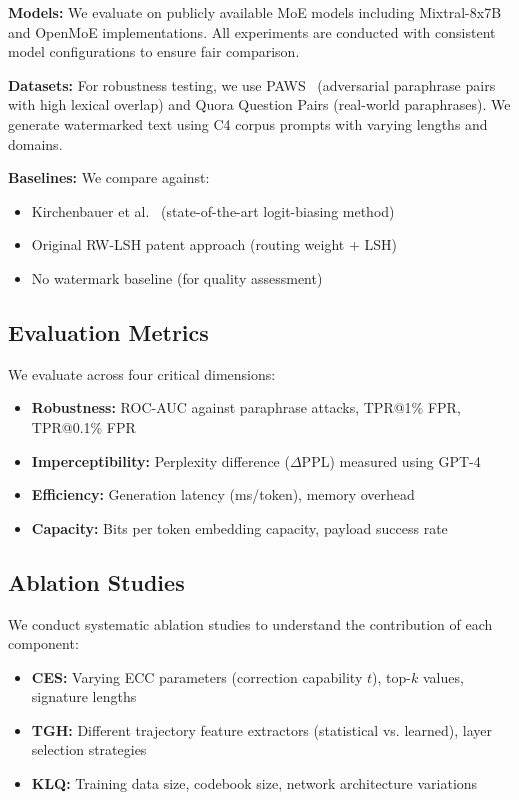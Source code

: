 \textbf{Models:} We evaluate on publicly available MoE models including Mixtral-8x7B and OpenMoE implementations. All experiments are conducted with consistent model configurations to ensure fair comparison.

\textbf{Datasets:} For robustness testing, we use PAWS~\cite{zhang2019paws} (adversarial paraphrase pairs with high lexical overlap) and Quora Question Pairs (real-world paraphrases). We generate watermarked text using C4 corpus prompts with varying lengths and domains.

\textbf{Baselines:} We compare against:
\begin{itemize}
\item Kirchenbauer et al.~\cite{kirchenbauer2023watermark} (state-of-the-art logit-biasing method)
\item Original RW-LSH patent approach (routing weight + LSH)
\item No watermark baseline (for quality assessment)
\end{itemize}

\subsection{Evaluation Metrics}

We evaluate across four critical dimensions:

\begin{itemize}
\item \textbf{Robustness:} ROC-AUC against paraphrase attacks, TPR@1\% FPR, TPR@0.1\% FPR
\item \textbf{Imperceptibility:} Perplexity difference ($\Delta$PPL) measured using GPT-4
\item \textbf{Efficiency:} Generation latency (ms/token), memory overhead
\item \textbf{Capacity:} Bits per token embedding capacity, payload success rate
\end{itemize}

\subsection{Ablation Studies}

We conduct systematic ablation studies to understand the contribution of each component:

\begin{itemize}
\item \textbf{CES:} Varying ECC parameters (correction capability $t$), top-$k$ values, signature lengths
\item \textbf{TGH:} Different trajectory feature extractors (statistical vs. learned), layer selection strategies
\item \textbf{KLQ:} Training data size, codebook size, network architecture variations
\end{itemize}

